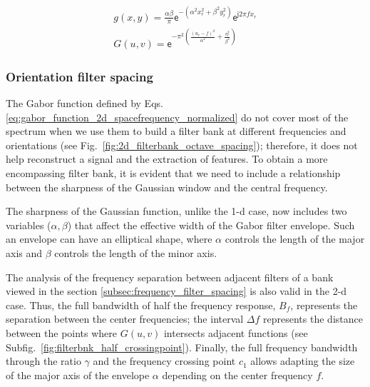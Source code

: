 \begin{equation}\label{eq:gabor_function_2d_spacefrequency_normalized}
    \begin{gathered}
        g(x, y) = \frac{\alpha \beta}{\pi} \mathsf{e}^{-\left(\alpha^2 x_r^2 + \beta^2 y_r^2\right)} \mathsf{e}^{\mathsf{j} 2 \pi f x_r } \\
        G(u, v) =   \mathsf{e}^{- \pi^2 \left(\frac{\left( u_r - f\right)^2}{\alpha^2} + \frac{v_r^2}{\beta^2}\right)} 
     \end{gathered}
\end{equation}

\subsubsection{Orientation filter spacing}

The Gabor function defined by Eqs. \eqref{eq:gabor_function_2d_spacefrequency_normalized} do not cover most of the spectrum when we use them to build a filter bank at different frequencies and orientations (see Fig.\ \ref{fig:2d_filterbank_octave_spacing}); therefore, it does not help reconstruct a signal and the extraction of features. To obtain a more encompassing filter bank, it is evident that we need to include a relationship between the sharpness of the Gaussian window and the central frequency. 

The sharpness of the Gaussian function, unlike the 1-d case, now includes two variables ($\alpha, \beta$) that affect the effective width of the Gabor filter envelope. Such an envelope can have an elliptical shape, where $\alpha $ controls the length of the major axis and $\beta$ controls the length of the minor axis. 

The analysis of the frequency separation between adjacent filters of a bank viewed in the section \ref{subsec:frequency_filter_spacing} is also valid in the 2-d case. Thus, the full bandwidth of half the frequency response, $B_f$, represents the separation between the center frequencies; the interval $\Delta f$ represents the distance between the points where $G(u, v)$ intersects adjacent functions (see Subfig.\ \ref{fig:filterbnk_half_crossingpoint}). Finally, the full frequency bandwidth through the ratio $\gamma$ and the frequency crossing point $c_1$ allows adapting the size of the major axis of the envelope $\alpha$ depending on the center frequency $f$.


